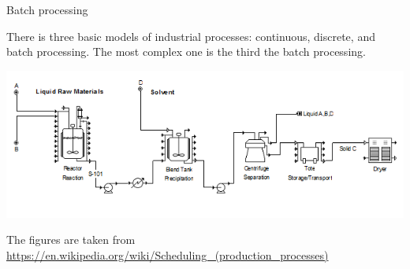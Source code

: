 \documentclass[10pt,dvipsnames]{beamer}
\begin{document}
\begin{frame}{Batch processing}

  There is three basic models of industrial processes: \alert{continuous}, \alert{discrete}, and \alert{batch processing}.  The most complex one is the third the batch processing.

    \includegraphics[width=0.9\linewidth]{pics/BatchProcessPFD.png}


\noindent The figures are taken from \url{https://en.wikipedia.org/wiki/Scheduling_(production_processes)}

\end{frame}
\end{document}
